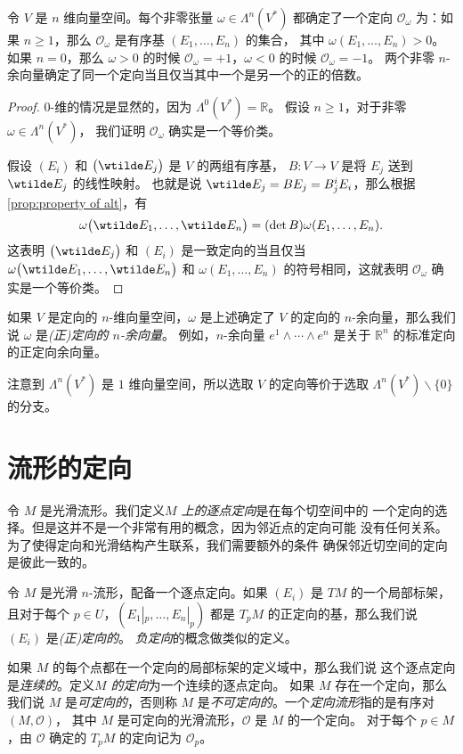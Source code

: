 \begin{proposition}
  令 $V$ 是 $n$ 维向量空间。每个非零张量 $\omega\in\Lambda^n(V^*)$
  都确定了一个定向 $\mathcal{O}_\omega$ 为：如果 $n\ge 1$，那么 
  $\mathcal{O}_\omega$ 是有序基 $(E_1,\dots,E_n)$ 的集合，
  其中 $\omega(E_1,\dots,E_n)>0$。如果 $n=0$，那么 $\omega>0$
  的时候 $\mathcal{O}_\omega=+1$，$\omega<0$ 的时候 $\mathcal{O}_\omega=-1$。
  两个非零 $n$-余向量确定了同一个定向当且仅当其中一个是另一个的正的倍数。 
\end{proposition}
\begin{proof}
  $0$-维的情况是显然的，因为 $\Lambda^0(V^*)=\mathbb{R}$。
  假设 $n\ge 1$，对于非零 $\omega\in \Lambda^n(V^*)$，
  我们证明 $\mathcal{O}_\omega$ 确实是一个等价类。

  假设 $(E_i)$ 和 $\bigl(\wtilde E_j\bigr)$ 是 $V$ 的两组有序基，
  $B:V\to V$ 是将 $E_j$ 送到 $\wtilde E_j$ 的线性映射。
  也就是说 $\wtilde E_j=BE_j=B^i_jE_i$，那么根据
  \autoref{prop:property of alt}，有
  \[
    \omega\bigl(\wtilde E_1,\dots,\wtilde E_n\bigr)  =
    (\det B)\omega(E_1,\dots,E_n).
  \]
  这表明 $\bigl(\wtilde E_j\bigr)$ 和 $(E_i)$ 是一致定向的当且仅当
  $\omega\bigl(\wtilde E_1,\dots,\wtilde E_n\bigr)$ 和 $\omega(E_1,\dots,E_n)$
  的符号相同，这就表明 $\mathcal{O}_\omega$ 确实是一个等价类。
\end{proof}

如果 $V$ 是定向的 $n$-维向量空间，$\omega$ 是上述确定了 $V$ 的定向的
$n$-余向量，那么我们说 $\omega$ 是\emph{(正)定向的 $n$-余向量}。
例如，$n$-余向量 $e^1\wedge\cdots\wedge e^n$ 是关于 $\mathbb{R}^n$
的标准定向的正定向余向量。

注意到 $\Lambda^n(V^*)$ 是 $1$ 维向量空间，所以选取 $V$ 的定向等价于选取
$\Lambda^n(V^*) \smallsetminus\{0\}$ 的分支。

\section{流形的定向}

令 $M$ 是光滑流形。我们定义\emph{$M$ 上的逐点定向}是在每个切空间中的
一个定向的选择。但是这并不是一个非常有用的概念，因为邻近点的定向可能
没有任何关系。为了使得定向和光滑结构产生联系，我们需要额外的条件
确保邻近切空间的定向是彼此一致的。

令 $M$ 是光滑 $n$-流形，配备一个逐点定向。如果 $(E_i)$ 是 $TM$
的一个局部标架，且对于每个 $p\in U$，$(E_1|_p,\dots,E_n|_p)$
都是 $T_pM$ 的正定向的基，那么我们说 $(E_i)$ 是\emph{(正)定向的}。
\emph{负定向}的概念做类似的定义。
 
如果 $M$ 的每个点都在一个定向的局部标架的定义域中，那么我们说
这个逐点定向是\emph{连续的}。定义\emph{$M$ 的定向}为一个连续的逐点定向。
如果 $M$ 存在一个定向，那么我们说 $M$ 是\emph{可定向的}，否则称
$M$ 是\emph{不可定向的}。一个\emph{定向流形}指的是有序对 $(M,\mathcal{O})$，
其中 $M$ 是可定向的光滑流形，$\mathcal{O}$ 是 $M$ 的一个定向。
对于每个 $p\in M$，由 $\mathcal{O}$ 确定的 $T_pM$ 的定向记为 $\mathcal{O}_p$。

  





